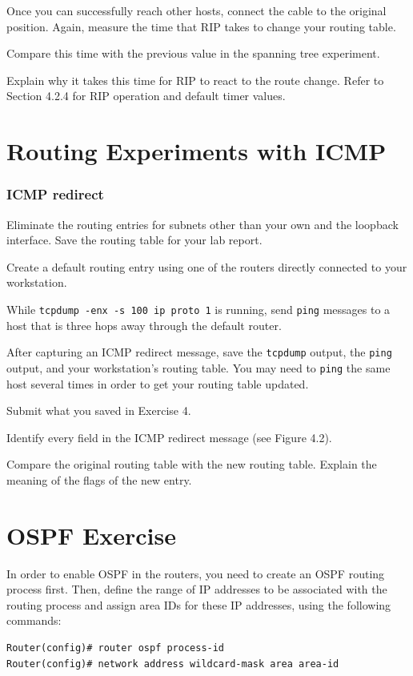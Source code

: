 \documentclass{../UTNetLab}
\begin{document}
    Once you can successfully reach other hosts, connect the cable to the original position.
    Again, measure the time that RIP takes to change your routing table.
    
    \begin{report}
    \item Compare this time with the previous value in the spanning tree experiment.
    
    \item Explain why it takes this time for RIP to react to the route change.
        Refer to Section 4.2.4 for RIP operation and default timer values.
    \end{report}


\part{Routing Experiments with ICMP}
\section{ICMP redirect}
    Eliminate the routing entries for subnets other than your own and the loopback interface.
    Save the routing table for your lab report.

    Create a default routing entry using one of the routers directly connected to your workstation.

    While \lstinline{tcpdump -enx -s 100 ip proto 1} is running, send \lstinline{ping} messages to a host that is three hops away through the default router.

    After capturing an ICMP redirect message, save the \lstinline{tcpdump} output, the \lstinline{ping} output, and your workstation’s routing table.
    You may need to \lstinline{ping} the same host several times in order to get your routing table updated.
    
    \begin{report}
        \item Submit what you saved in Exercise 4.
        
        \item Identify every field in the ICMP redirect message (see Figure 4.2).
        
        \item Compare the original routing table with the new routing table. Explain the meaning of the flags of the new entry.
    \end{report}


\part{OSPF Exercise}
    In order to enable OSPF in the routers, you need to create an OSPF routing process first.
    Then, define the range of IP addresses to be associated with the routing process and assign area IDs for these IP addresses, using the following commands:
    \begin{lstlisting}[language={cisco}, emph={process-id, area-id, address, wildcard-mask}]
Router(config)# router ospf process-id
Router(config)# network address wildcard-mask area area-id
    \end{lstlisting}
    
\end{document}
